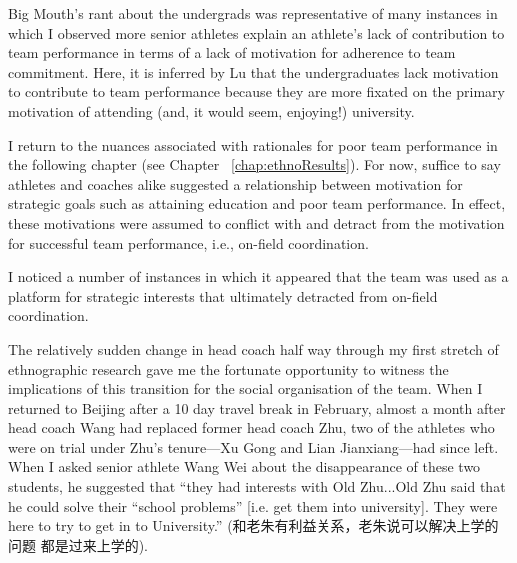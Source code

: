 \begin{CJK}{UTF8}{gbsn}
Big Mouth's rant about the undergrads was representative of many instances in which I observed more senior athletes explain an athlete's lack of contribution to team performance in terms of a lack of motivation for adherence to team commitment.  Here, it is inferred by Lu that the undergraduates lack motivation to contribute to team performance because they are more fixated on the primary motivation of attending (and, it would seem, enjoying!) university.

I return to the nuances associated with rationales for poor team performance in the following chapter (see Chapter ~\ref{chap:ethnoResults}).  For now, suffice to say athletes and coaches alike suggested a relationship between motivation for strategic goals such as attaining education and poor team performance.  In effect, these motivations were assumed to conflict with and detract from the motivation for successful team performance, i.e., on-field coordination.












I noticed a number of instances in which it appeared that the team was used as a platform for strategic interests that ultimately detracted from on-field coordination.

The relatively sudden change in head coach half way through my first stretch of ethnographic research gave me the fortunate opportunity to witness the implications of this transition for the social organisation of the team.  When I returned to Beijing after a 10 day travel break in February, almost a month after head coach Wang had replaced former head coach Zhu, two of the athletes who were on trial under Zhu's tenure---Xu Gong and Lian Jianxiang---had since left.  When I asked senior athlete Wang Wei about the disappearance of these two students, he suggested that ``they had interests with Old Zhu...Old Zhu said that he could solve their ``school problems'' [i.e. get them into university]. They were here to try to get in to University.'' (和老朱有利益关系，老朱说可以解决上学的问题 都是过来上学的).


\end{CJK}

